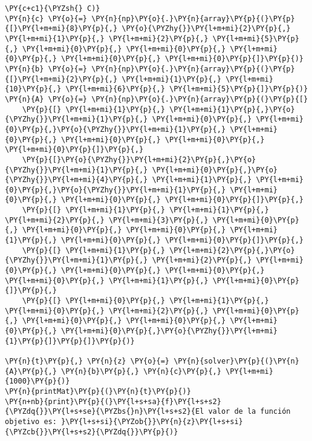\begin{tcolorbox}[breakable, size=fbox, boxrule=1pt, pad at break*=1mm,colback=cellbackground, colframe=cellborder]
\begin{Verbatim}[commandchars=\\\{\}]
\PY{c+c1}{\PYZsh{} C)}
\PY{n}{c} \PY{o}{=} \PY{n}{np}\PY{o}{.}\PY{n}{array}\PY{p}{(}\PY{p}{[}\PY{l+m+mi}{8}\PY{p}{,} \PY{o}{\PYZhy{}}\PY{l+m+mi}{2}\PY{p}{,} \PY{l+m+mi}{1}\PY{p}{,} \PY{l+m+mi}{2}\PY{p}{,} \PY{l+m+mi}{5}\PY{p}{,} \PY{l+m+mi}{0}\PY{p}{,} \PY{l+m+mi}{0}\PY{p}{,} \PY{l+m+mi}{0}\PY{p}{,} \PY{l+m+mi}{0}\PY{p}{,} \PY{l+m+mi}{0}\PY{p}{]}\PY{p}{)}
\PY{n}{b} \PY{o}{=} \PY{n}{np}\PY{o}{.}\PY{n}{array}\PY{p}{(}\PY{p}{[}\PY{l+m+mi}{2}\PY{p}{,} \PY{l+m+mi}{1}\PY{p}{,} \PY{l+m+mi}{10}\PY{p}{,} \PY{l+m+mi}{6}\PY{p}{,} \PY{l+m+mi}{5}\PY{p}{]}\PY{p}{)}
\PY{n}{A} \PY{o}{=} \PY{n}{np}\PY{o}{.}\PY{n}{array}\PY{p}{(}\PY{p}{[}
    \PY{p}{[} \PY{l+m+mi}{1}\PY{p}{,} \PY{l+m+mi}{1}\PY{p}{,}\PY{o}{\PYZhy{}}\PY{l+m+mi}{1}\PY{p}{,} \PY{l+m+mi}{0}\PY{p}{,} \PY{l+m+mi}{0}\PY{p}{,}\PY{o}{\PYZhy{}}\PY{l+m+mi}{1}\PY{p}{,} \PY{l+m+mi}{0}\PY{p}{,} \PY{l+m+mi}{0}\PY{p}{,} \PY{l+m+mi}{0}\PY{p}{,} \PY{l+m+mi}{0}\PY{p}{]}\PY{p}{,}
    \PY{p}{[}\PY{o}{\PYZhy{}}\PY{l+m+mi}{2}\PY{p}{,}\PY{o}{\PYZhy{}}\PY{l+m+mi}{1}\PY{p}{,} \PY{l+m+mi}{0}\PY{p}{,}\PY{o}{\PYZhy{}}\PY{l+m+mi}{4}\PY{p}{,} \PY{l+m+mi}{1}\PY{p}{,} \PY{l+m+mi}{0}\PY{p}{,}\PY{o}{\PYZhy{}}\PY{l+m+mi}{1}\PY{p}{,} \PY{l+m+mi}{0}\PY{p}{,} \PY{l+m+mi}{0}\PY{p}{,} \PY{l+m+mi}{0}\PY{p}{]}\PY{p}{,}
    \PY{p}{[} \PY{l+m+mi}{1}\PY{p}{,} \PY{l+m+mi}{1}\PY{p}{,} \PY{l+m+mi}{2}\PY{p}{,} \PY{l+m+mi}{3}\PY{p}{,} \PY{l+m+mi}{0}\PY{p}{,} \PY{l+m+mi}{0}\PY{p}{,} \PY{l+m+mi}{0}\PY{p}{,} \PY{l+m+mi}{1}\PY{p}{,} \PY{l+m+mi}{0}\PY{p}{,} \PY{l+m+mi}{0}\PY{p}{]}\PY{p}{,}
    \PY{p}{[} \PY{l+m+mi}{1}\PY{p}{,} \PY{l+m+mi}{2}\PY{p}{,}\PY{o}{\PYZhy{}}\PY{l+m+mi}{1}\PY{p}{,} \PY{l+m+mi}{2}\PY{p}{,} \PY{l+m+mi}{0}\PY{p}{,} \PY{l+m+mi}{0}\PY{p}{,} \PY{l+m+mi}{0}\PY{p}{,} \PY{l+m+mi}{0}\PY{p}{,} \PY{l+m+mi}{1}\PY{p}{,} \PY{l+m+mi}{0}\PY{p}{]}\PY{p}{,}
    \PY{p}{[} \PY{l+m+mi}{0}\PY{p}{,} \PY{l+m+mi}{1}\PY{p}{,} \PY{l+m+mi}{0}\PY{p}{,} \PY{l+m+mi}{2}\PY{p}{,} \PY{l+m+mi}{0}\PY{p}{,} \PY{l+m+mi}{0}\PY{p}{,} \PY{l+m+mi}{0}\PY{p}{,} \PY{l+m+mi}{0}\PY{p}{,} \PY{l+m+mi}{0}\PY{p}{,}\PY{o}{\PYZhy{}}\PY{l+m+mi}{1}\PY{p}{]}\PY{p}{]}\PY{p}{)}

\PY{n}{t}\PY{p}{,} \PY{n}{z} \PY{o}{=} \PY{n}{solver}\PY{p}{(}\PY{n}{A}\PY{p}{,} \PY{n}{b}\PY{p}{,} \PY{n}{c}\PY{p}{,} \PY{l+m+mi}{1000}\PY{p}{)}
\PY{n}{printMat}\PY{p}{(}\PY{n}{t}\PY{p}{)}
\PY{n+nb}{print}\PY{p}{(}\PY{l+s+sa}{f}\PY{l+s+s2}{\PYZdq{}}\PY{l+s+se}{\PYZbs{}n}\PY{l+s+s2}{El valor de la función objetivo es: }\PY{l+s+si}{\PYZob{}}\PY{n}{z}\PY{l+s+si}{\PYZcb{}}\PY{l+s+s2}{\PYZdq{}}\PY{p}{)}
\end{Verbatim}
\end{tcolorbox}

